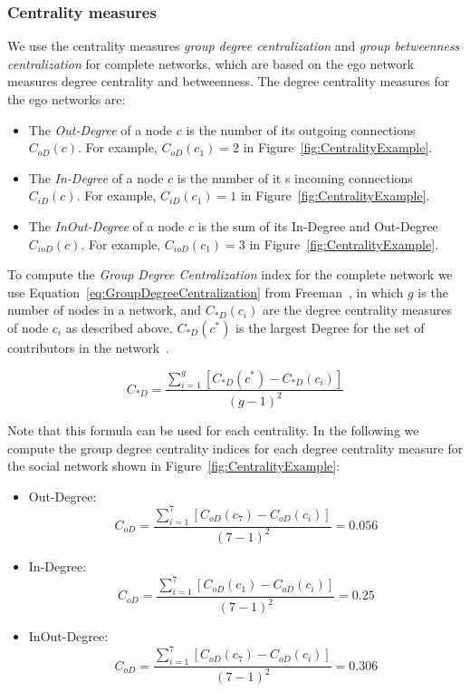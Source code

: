 \subsubsection{Centrality measures}
We use the centrality measures \emph{group degree centralization} and
\emph{group betweenness centralization} for complete networks, which are based on
the ego network measures degree centrality and betweenness. The degree
centrality measures for the ego networks are:

\begin{itemize}
  \item The \emph{Out-Degree} of a node $c$ is the
  number of its outgoing connections $C_{oD}(c)$. For example, $C_{oD}(c_1)=2$ in 
  Figure~\ref{fig:CentralityExample}.
  
  \item The \emph{In-Degree} of a node $c$ is the
  number of it s incoming connections $C_{iD}(c)$. For example, $C_{iD}(c_1)=1$ 
  in Figure~\ref{fig:CentralityExample}.
  
  \item The \emph{InOut-Degree} of a node $c$ is the sum of its In-Degree and
  Out-Degree $C_{ioD}(c)$. For example, $C_{ioD}(c_1)=3$
  in Figure~\ref{fig:CentralityExample}.
\end{itemize}

To compute the \emph{Group Degree Centralization} index for the complete network
we use Equation~\ref{eq:GroupDegreeCentralization} from
Freeman~\cite{Freeman:1979rl}, in which $g$ is the number of nodes in a network,
and $C_{*D}(c_i)$ are the degree centrality measures of node $c_i$ as
described above. $C_{*D}(c^*)$ is the largest Degree for the set of
contributors in the network~\cite{Gloor:2003cikm,hinds:cscw:2006}.

\begin{equation}
\displaystyle C_{*D} =  \frac{\sum_{i=1}^g[C_{*D}(c^*) - C_{*D}(c_i)]}{(g-1)^2}
\label{eq:GroupDegreeCentralization}
\end{equation}

Note that this formula can be used for each centrality. In the following we compute the group degree centrality indices for each degree centrality measure for the social network shown in Figure~\ref{fig:CentralityExample}:
\begin{itemize}
\item Out-Degree:
\begin{equation}
\displaystyle C_{oD} = \frac{\sum_{i=1}^7[C_{oD}(c_7) - C_{oD}(c_i)]}{(7-1)^2} = 0.056
\end{equation}
\item In-Degree:
\begin{equation}
\displaystyle C_{oD} = \frac{\sum_{i=1}^7[C_{oD}(c_1) - C_{oD}(c_i)]}{(7-1)^2} = 0.25
\end{equation}
\item InOut-Degree:
\begin{equation}
\displaystyle C_{oD} = \frac{\sum_{i=1}^7[C_{oD}(c_7) - C_{oD}(c_i)]}{(7-1)^2} = 0.306
\end{equation}
\end{itemize}

